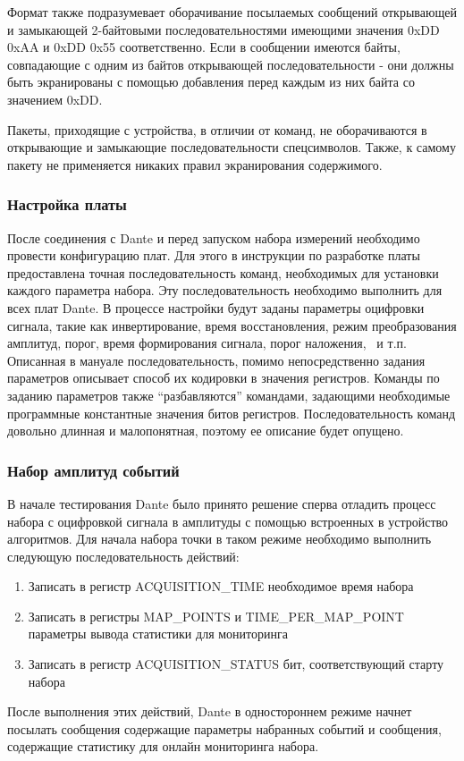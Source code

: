 \documentclass[a4paper,14pt]{extreport}
\begin{document}
Формат также подразумевает оборачивание посылаемых сообщений открывающей и замыкающей 2-байтовыми последовательностями имеющими значения 0xDD 0xAA и 0xDD 0x55 соответственно. Если в сообщении имеются байты, совпадающие с одним из байтов открывающей последовательности - они должны быть экранированы с помощью добавления перед каждым из них байта со значением 0xDD.

Пакеты, приходящие с устройства, в отличии от команд, не оборачиваются в открывающие и замыкающие последовательности спецсимволов. Также, к самому пакету не применяется никаких правил экранирования содержимого.

\subsubsection{Настройка платы}

После соединения с Dante и перед запуском набора измерений необходимо провести конфигурацию плат. Для этого в инструкции по разработке платы предоставлена точная последовательность команд, необходимых для установки каждого параметра набора. Эту последовательность необходимо выполнить для всех плат Dante. В процессе настройки будут заданы параметры оцифровки сигнала, такие как инвертирование, время восстановления, режим преобразования амплитуд, порог, время формирования сигнала, порог наложения, ~и т.п. Описанная в мануале последовательность, помимо непосредственно задания параметров описывает способ их кодировки в значения регистров. Команды по заданию параметров также “разбавляются” командами, задающими необходимые программные константные значения битов регистров. Последовательность команд довольно длинная и малопонятная, поэтому ее описание будет опущено.

\subsubsection{Набор амплитуд событий}

В начале тестирования Dante было принято решение сперва отладить процесс набора с оцифровкой сигнала в амплитуды с помощью встроенных в устройство алгоритмов. Для начала набора точки в таком режиме необходимо выполнить следующую последовательность действий:

\begin{enumerate}
    \item Записать в регистр ACQUISITION\_TIME необходимое время набора
    \item Записать в регистры MAP\_POINTS и TIME\_PER\_MAP\_POINT параметры вывода статистики для мониторинга
    \item Записать в регистр ACQUISITION\_STATUS бит, соответствующий старту набора
\end{enumerate}
После выполнения этих действий, Dante в одностороннем режиме начнет посылать сообщения содержащие параметры набранных событий и сообщения, содержащие статистику для онлайн мониторинга набора.
\end{document}
